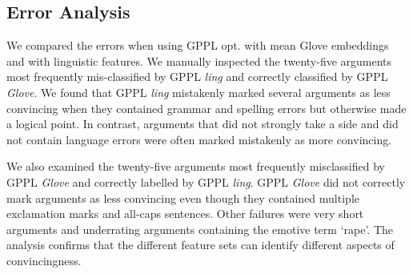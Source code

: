 \subsection{Error Analysis}

We compared the errors when using GPPL opt. with mean Glove embeddings
and with linguistic features. We
manually inspected the twenty-five arguments most frequently
mis-classified by GPPL \emph{ling} and correctly classified by GPPL \emph{Glove}.
We found that GPPL \emph{ling} mistakenly marked several arguments 
as less convincing when they contained grammar and spelling errors but otherwise
made a logical point. 
In contrast, arguments that did not strongly take a side and did not contain 
language errors were often marked mistakenly as more convincing.

We also examined the twenty-five arguments most frequently misclassified by GPPL \emph{Glove} and correctly labelled by GPPL \emph{ling}.
GPPL \emph{Glove} did not correctly mark arguments as less convincing 
even though they contained multiple exclamation marks and all-caps sentences. 
Other failures were very short arguments and underrating arguments containing the emotive term `rape'.
The analysis confirms that the different feature sets can identify different aspects of convincingness.

